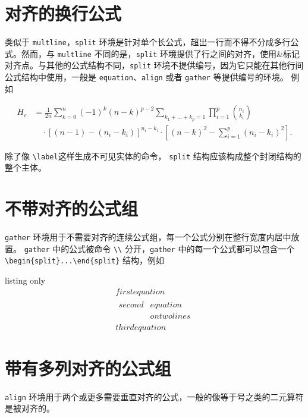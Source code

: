 \section{对齐的换行公式}
类似于 \verb|multline|，\verb|split| 环境是针对单个长公式，超出一行而不得不分成多行公式。然而，与 \verb|multline| 不同的是，\verb|split| 环境提供了行之间的对齐，使用\&标记对齐点。与其他的公式结构不同，\verb|split| 环境不提供编号，因为它只能在其他行间公式结构中使用，一般是 \verb|equation|、\verb|align| 或者 \verb|gather| 等提供编号的环境。 例如
\begin{tcblisting}{}
\begin{equation}\label{e:barwq}\begin{split}
H_c&=\frac{1}{2n} \sum^n_{k=0}(-1)^{k}(n-k)^{p-2}
  \sum_{k_1+\dots+k_p=1}\prod^p_{i=1} \binom{n_i}{k _i}\\
  &\quad\cdot[(n-1)-(n_i-k_i)]^{n_i-k_i}\cdot
   \left[(n-k)^2-\sum^p_{i=1}(n_i-k_i)^2\right].
\end{split}\end{equation}
\end{tcblisting}


除了像 \verb|\label|这样生成不可见实体的命令，  \verb|split| 结构应该构成整个封闭结构的整个主体。
\section{不带对齐的公式组}
\verb|gather| 环境用于不需要对齐的连续公式组，每一个公式分别在整行宽度内居中放置。 \verb|gather| 中的公式被命令 \verb|\\| 分开，\verb|gather| 中的每一个公式都可以包含一个\\ \verb|\begin{split}...\end{split}| 结构，例如
\begin{tcblisting}{listing only}
\begin{gather}
first equation\\
\begin{split}
second & equation\\
       & on two lines
\end{split}\\
third equation
\end{gather}
\end{tcblisting}

\section{带有多列对齐的公式组}
\verb|align| 环境用于两个或更多需要垂直对齐的公式，一般的像等于号之类的二元算符是被对齐的。

